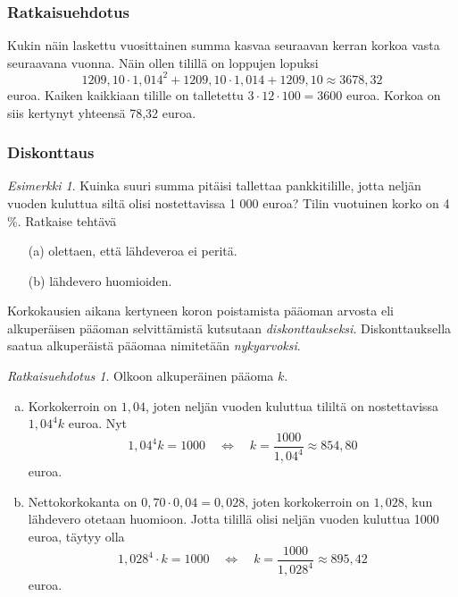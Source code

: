 \documentclass{beamer}\usepackage[]{graphicx}\usepackage[]{color}
\theoremstyle{remark}
\newtheorem{esim}{Esimerkki}
\newtheorem{ratkaisu}{Ratkaisuehdotus}
\begin{document}
\begin{frame}
  \frametitle{Ratkaisuehdotus}
        Kukin näin laskettu vuosittainen summa kasvaa seuraavan kerran korkoa vasta seuraavana vuonna.
        \pause
        Näin ollen tilillä on loppujen lopuksi
        \pause
        \[
            1209,10\cdot 1,014^2+1209,10\cdot1,014+1209,10\approx 3678,32
        \]
        euroa.
        \pause
        Kaiken kaikkiaan tilille on talletettu \(3\cdot12\cdot100 = 3600\) euroa.
        \pause
        Korkoa on siis kertynyt yhteensä 78,32 euroa.
\end{frame}

\begin{frame}
    \frametitle{Diskonttaus}
    \pause
    \begin{esim}
        Kuinka suuri summa pitäisi tallettaa pankkitilille, jotta neljän vuoden kuluttua siltä olisi nostettavissa 1 000 euroa? 
        Tilin vuotuinen korko on 4 \%. Ratkaise tehtävä
        \begin{enumerate}
            \item[(a)] olettaen, että lähdeveroa ei peritä.
            \item[(b)] lähdevero huomioiden.
        \end{enumerate}
    \end{esim}
    \pause
    Korkokausien aikana kertyneen koron poistamista pääoman arvosta eli alkuperäisen pääoman selvittämistä kutsutaan 
    \emph{diskonttaukseksi}.
    \pause
    Diskonttauksella saatua alkuperäistä pääomaa nimitetään \emph{nykyarvoksi}.
\end{frame}

\begin{frame}
    \begin{ratkaisu}
        Olkoon alkuperäinen pääoma \(k\).
        \begin{enumerate}[(a)]
            \item Korkokerroin on \(1,04\), joten neljän vuoden kuluttua tililtä on nostettavissa \(1,04^4k\) euroa. 
            \pause
                Nyt
                \[
                    1,04^4k = 1000\quad\Leftrightarrow\quad k = \frac{1000}{1,04^4}\approx 854,80
                \]
                euroa.
            \pause
            \item Nettokorkokanta on \(0,70\cdot0,04=0,028\), joten korkokerroin on \(1,028\), kun lähdevero otetaan huomioon. \pause
                Jotta tilillä olisi neljän vuoden kuluttua 1000 euroa, täytyy olla
                \[
                    1,028^4\cdot k = 1000\quad\Leftrightarrow\quad k = \frac{1000}{1,028^4}\approx 895,42
                \]
                euroa.
        \end{enumerate}
    \end{ratkaisu}
\end{frame}
\end{document}
